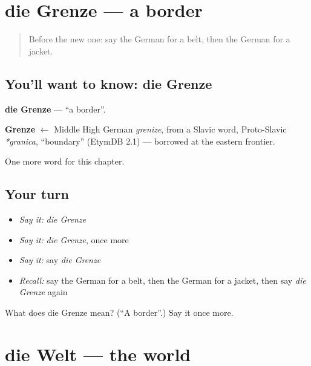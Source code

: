 \section[die Grenze]{die Grenze — a border}

\label{lesson:GE-C100-grenze}



\begin{quote}
Before the new one: say the German for a belt, then the German for a jacket.
\end{quote}

\subsection*{You'll want to know: die Grenze}
\textbf{die Grenze} — \textquotedblleft{}a border\textquotedblright{}.

\begin{cousinweb}
\textbf{Grenze} $\leftarrow$ Middle High German \emph{grenize}, from a Slavic word, Proto-Slavic \emph{*granica}, \textquotedblleft{}boundary\textquotedblright{} (EtymDB 2.1) — borrowed at the eastern frontier.
\end{cousinweb}

\begin{grammarlens}[title={What you've built}]
One more word for this chapter.
\end{grammarlens}

\subsection*{Your turn}
\begin{itemize}
\raggedright
  \item \emph{Say it:} \emph{die Grenze}
  \item \emph{Say it:} \emph{die Grenze}, once more
  \item \emph{Say it:} say \emph{die Grenze}
  \item \emph{Recall:} say the German for a belt, then the German for a jacket, then say \emph{die Grenze} again
\end{itemize}

\begin{tcolorbox}[breakable,colback=teal!4,colframe=teal!35!black,title={Before you move on}]
What does die Grenze mean? (\textquotedblleft{}A border\textquotedblright{}.) Say it once more.
\end{tcolorbox}
\section[die Welt]{die Welt — the world}

